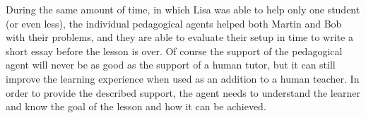 During the same amount of time, in which Lisa was able to help only one student (or even less),
the individual pedagogical agents helped both Martin and Bob with
their problems, and they are able to evaluate their setup in time to
write a short essay before the lesson is over. Of course the support of the pedagogical
agent will never be as good as the support of a human tutor, but it can still improve
the learning experience when used as an addition to a human teacher. In order to provide the
described support, the agent needs to understand the learner and know the goal of the
lesson and how it can be achieved.


